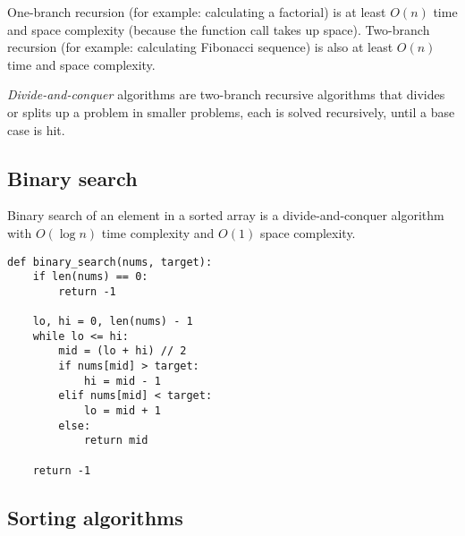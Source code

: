 \documentclass[8pt, table, xcdraw]{article}%
\begin{document}
One-branch recursion (for example: calculating a factorial) is at least $O(n)$ time and space complexity (because the function call takes up space). Two-branch recursion (for example: calculating Fibonacci sequence) is also at least $O(n)$ time and space complexity.

\emph{Divide-and-conquer} algorithms are two-branch recursive algorithms that divides or splits up a problem in smaller problems, each is solved recursively, until a base case is hit.

\subsection{Binary search}

Binary search of an element in a sorted array is a divide-and-conquer algorithm with $O(\log n)$ time complexity and $O(1)$ space complexity.

\begin{lstlisting}
def binary_search(nums, target):
    if len(nums) == 0:
    	return -1
    
    lo, hi = 0, len(nums) - 1
    while lo <= hi:
    	mid = (lo + hi) // 2
    	if nums[mid] > target:
    		hi = mid - 1
    	elif nums[mid] < target:
    		lo = mid + 1
    	else:
    		return mid
    
    return -1
\end{lstlisting}

\subsection{Sorting algorithms}
\end{document}
